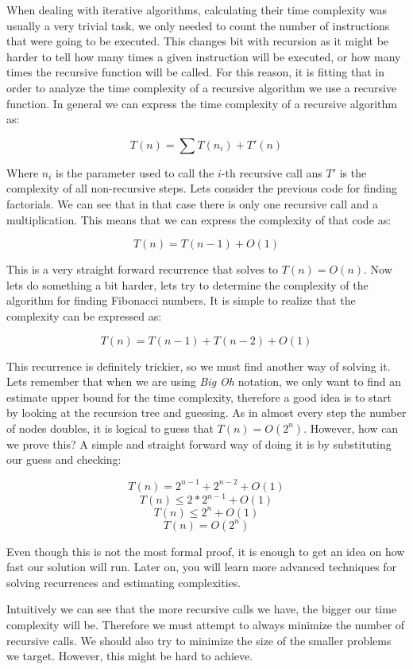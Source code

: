 \documentclass{article}
\begin{document}
When dealing with iterative algorithms, calculating their time complexity was usually a very trivial task, we only needed to count the number of instructions that were going to be executed. This changes bit with recursion as it might be harder to tell how many times a given instruction will be executed, or how many times the recursive function will be called. For this reason, it is fitting that in order to analyze the time complexity of a recursive algorithm we use a recursive function. In general we can express the time complexity of a recursive algorithm as:

$$T(n) = \sum T(n_i) + T'(n)$$

Where $n_i$ is the parameter used to call the $i$-th recursive call ans $T'$ is the complexity of all non-recursive steps. Lets consider the previous code for finding factorials. We can see that in that case there is only one recursive call and a multiplication. This means that we can express the complexity of that code as:

$$T(n) = T(n - 1) + O(1)$$

This is a very straight forward recurrence that solves to $T(n) = O(n)$. Now lets do something a bit harder, lets try to determine the complexity of the algorithm for finding Fibonacci numbers. It is simple to realize that the complexity can be expressed as:

$$T(n) = T(n - 1) + T(n - 2) + O(1)$$

This recurrence is definitely trickier, so we must find another way of solving it. Lets remember that when we are using \textit{Big Oh} notation, we only want to find an estimate upper bound for the time complexity, therefore a good idea is to start by looking at the recursion tree and guessing. As in almost every step the number of nodes doubles, it is logical to guess that $T(n) = O(2^n)$. However, how can we prove this? A simple and straight forward way of doing it is by substituting our guess and checking:

$$T(n) = 2^{n - 1} + 2^{n - 2} + O(1)$$
$$T(n) \leq 2 * 2^{n - 1} + O(1)$$
$$T(n) \leq 2^n + O(1)$$
$$T(n) = O(2^n)$$

Even though this is not the most formal proof, it is enough to get an idea on how fast our solution will run. Later on, you will learn more advanced techniques for solving recurrences and estimating complexities.

Intuitively we can see that the more recursive calls we have, the bigger our time complexity will be. Therefore we must attempt to always minimize the number of recursive calls. We should also try to minimize the size of the smaller problems we target. However, this might be hard to achieve.
\end{document}

